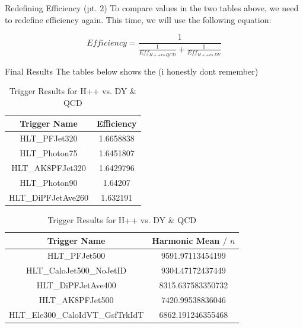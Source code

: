 \documentclass[final]{beamer}
\newlength{\colwidth}
\begin{document}
\begin{frame}[t]
\begin{columns}[t]
\begin{column}{\colwidth}
  \begin{block}{Redefining Efficiency (pt. 2)}
    To compare values in the two tables above, we need to redefine efficiency again. This time, we will use the following equation:

    $$Efficiency = \frac{1}{\frac{1}{Eff_{H++ vs. QCD}} + \frac{1}{Eff_{H++ vs. DY}}}$$
  \end{block}

  \begin{block}{Final Results}
    The tables below shows the (i honestly dont remember)

    \begin{table}[h!]
      \caption{\label{table:6}Trigger Results for H++ vs. DY \& QCD}
          \begin{tabular}[t]{c|c}
              \hline
              \textbf{Trigger Name} & \textbf{Efficiency}\\
              \hline
              HLT\_PFJet320 & 1.6658838 \\
              HLT\_Photon75 & 1.6451807 \\
              HLT\_AK8PFJet320 & 1.6429796 \\
              HLT\_Photon90 & 1.64207 \\
              HLT\_DiPFJetAve260 & 1.632191
          \end{tabular}
  \end{table}

  \begin{table}[h!]
    \caption{\label{table:6}Trigger Results for H++ vs. DY \& QCD}
        \begin{tabular}[t]{c|c}
            \hline
            \textbf{Trigger Name} & \textbf{Harmonic Mean $/$ $n$}\\
            \hline
                HLT\_PFJet500 & 9591.97113454199 \\
                HLT\_CaloJet500\_NoJetID & 9304.47172437449 \\
                HLT\_DiPFJetAve400 & 8315.637583350732 \\
                HLT\_AK8PFJet500 & 7420.99538836046 \\
                HLT\_Ele300\_CaloIdVT\_GsfTrkIdT & 6862.191246355468
        \end{tabular}
\end{table}
  \end{block}

\end{column}


\end{columns}
\end{frame}
\end{document}

